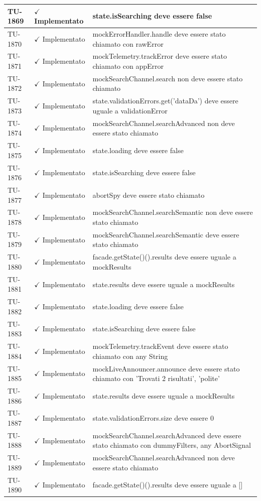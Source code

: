 ﻿\documentclass[a4paper,12pt]{article}
\newcommand{\ok}{\textcolor{green!60!black}{$\checkmark$ Implementato}}
\begin{document}
\begin{longtable}{|p{2cm}|p{3.5cm}|p{9.5cm}|}
\hline
TU-1869 & \ok & state.isSearching deve essere false \\
\hline
TU-1870 & \ok & mockErrorHandler.handle deve essere stato chiamato con rawError \\
\hline
TU-1871 & \ok & mockTelemetry.trackError deve essere stato chiamato con appError \\
\hline
TU-1872 & \ok & mockSearchChannel.search non deve essere stato chiamato \\
\hline
TU-1873 & \ok & state.validationErrors.get('dataDa') deve essere uguale a validationError \\
\hline
TU-1874 & \ok & mockSearchChannel.searchAdvanced non deve essere stato chiamato \\
\hline
TU-1875 & \ok & state.loading deve essere false \\
\hline
TU-1876 & \ok & state.isSearching deve essere false \\
\hline
TU-1877 & \ok & abortSpy deve essere stato chiamato \\
\hline
TU-1878 & \ok & mockSearchChannel.searchSemantic non deve essere stato chiamato \\
\hline
TU-1879 & \ok & mockSearchChannel.searchSemantic deve essere stato chiamato \\
\hline
TU-1880 & \ok & facade.getState()().results deve essere uguale a mockResults \\
\hline
TU-1881 & \ok & state.results deve essere uguale a mockResults \\
\hline
TU-1882 & \ok & state.loading deve essere false \\
\hline
TU-1883 & \ok & state.isSearching deve essere false \\
\hline
TU-1884 & \ok & mockTelemetry.trackEvent deve essere stato chiamato con any String \\
\hline
TU-1885 & \ok & mockLiveAnnouncer.announce deve essere stato chiamato con 'Trovati 2 risultati', 'polite' \\
\hline
TU-1886 & \ok & state.results deve essere uguale a mockResults \\
\hline
TU-1887 & \ok & state.validationErrors.size deve essere 0 \\
\hline
TU-1888 & \ok & mockSearchChannel.searchAdvanced deve essere stato chiamato con dummyFilters, any AbortSignal \\
\hline
TU-1889 & \ok & mockSearchChannel.searchAdvanced non deve essere stato chiamato \\
\hline
TU-1890 & \ok & facade.getState()().results deve essere uguale a [] \\

\end{longtable}
\end{document}
